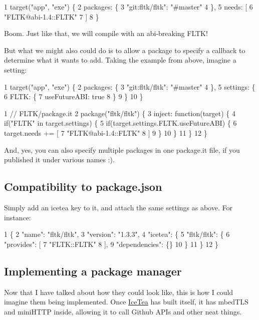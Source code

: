 \begin{DoxyCode}
1 target("app", "exe") \{
2     packages: \{
3         "git:fltk/fltk": "#master"
4     \},
5     needs: [
6         "FLTK@abi-1.4::FLTK"
7     ]
8 \}
\end{DoxyCode}
 Boom. Just like that, we will compile with an abi-\/breaking F\+L\+T\+K!

But what we might also could do is to allow a package to specify a callback to determine what it wants to add. Taking the example from above, imagine a setting\+: 
\begin{DoxyCode}
1 target("app", "exe") \{
2     packages: \{
3         "git:fltk/fltk": "#master"
4     \},
5     settings: \{
6         FLTK: \{
7             useFutureABI: true
8         \}
9     \}
10 \}
\end{DoxyCode}
 
\begin{DoxyCode}
1 // FLTK/package.it
2 package("fltk/fltk") \{
3     inject: function(target) \{
4         if("FLTK" in target.settings) \{
5             if(target.settings.FLTK.useFutureABI) \{
6                 target.needs += [
7                     "FLTK@abi-1.4::FLTK"
8                 ]
9             \}
10         \}
11     \}
12 \}
\end{DoxyCode}


And, yes, you can also specify multiple packages in one {\ttfamily package.\+it} file, if you published it under various names \+:).

\subsection*{Compatibility to package.\+json}

Simply add an {\ttfamily icetea} key to it, and attach the same settings as above. For instance\+:


\begin{DoxyCode}
1 \{
2     "name": "fltk/fltk",
3     "version": "1.3.3",
4     "icetea": \{
5         "fltk/fltk": \{
6             "provides": [
7                 "FLTK::FLTK"
8             ],
9             "dependencies": \{\}
10         \}
11     \}
12 \}
\end{DoxyCode}


\subsection*{Implementing a package manager}

Now that I have talked about how they could look like, this is how I could imagine them being implemented. Once \hyperlink{class_ice_tea}{Ice\+Tea} has built itself, it has mbed\+T\+LS and mini\+H\+T\+TP inside, allowing it to call Github A\+P\+Is and other neat things.

